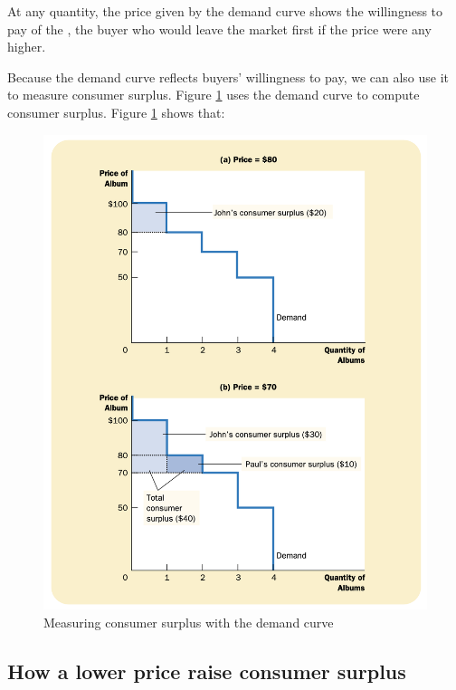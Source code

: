 At any quantity, the price given by the demand curve shows the willingness to pay of the ,
the buyer who would leave the market first if the price were any higher.


Because the demand curve reflects buyers’ willingness to pay, we can also use it to measure consumer surplus.
Figure \ref{fig:consumer-surplus} uses the demand curve to compute consumer surplus.
Figure \ref{fig:consumer-surplus} shows that:
\begin{figure}[!ht]
  \centering
  \includegraphics[width=\textwidth]{pics/consumer-surplus}
  \caption[Consumer surplus]{Measuring consumer surplus with the demand curve}
  \label{fig:consumer-surplus}
\end{figure}

\subsection{How a lower price raise consumer surplus}

